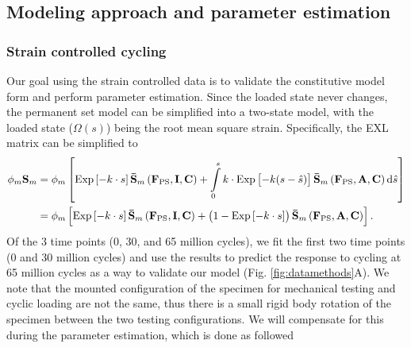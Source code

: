 
\subsection{Modeling approach and parameter estimation}


\subsubsection{Strain controlled cycling}
	Our goal using the strain controlled data is to validate the constitutive model form and perform parameter estimation. Since the loaded state never changes, the permanent set model can be simplified into a two-state model, with the loaded state ($\Omega(s)$) being the root mean square strain. Specifically, the EXL matrix can be simplified to
\begin{equation} 
\begin{split}
\phi_m \mathbf{S}_m &= \phi_m \left[ \mathrm{Exp}\left[-k  \cdot s\right] \mathbf{\bar{S}}_m \left(\mathbf{F}_\mathrm{PS}, \mathbf{I},\mathbf{C}\right) + \int\displaylimits_0^s k \cdot  \mathrm{Exp}\left[-k (s - \hat{s})\right] \mathbf{\bar{S}}_m \left(\mathbf{F}_\mathrm{PS}, \mathbf{A},\mathbf{C}\right) \mathrm{d}\hat{s} \right] \\
&= \phi_m \left[ \mathrm{Exp}\left[-k  \cdot s\right] \mathbf{\bar{S}}_m \left(\mathbf{F}_\mathrm{PS}, \mathbf{I},\mathbf{C}\right) + \left(1 - \mathrm{Exp}\left[-k  \cdot s\right] \right) \mathbf{\bar{S}}_m \left(\mathbf{F}_\mathrm{PS}, \mathbf{A},\mathbf{C}\right) \right].
\end{split}
\end{equation}
Of the 3 time points (0, 30, and 65 million cycles), we fit the first two time points (0 and 30 million cycles) and use the results to predict the response to cycling at 65 million cycles as a way to validate our model (Fig. \ref{fig:datamethods}A). We note that the mounted configuration of the specimen for mechanical testing and cyclic loading are not the same, thus there is a small rigid body rotation of the specimen between the two testing configurations. We will compensate for this during the parameter estimation, which is done as followed
